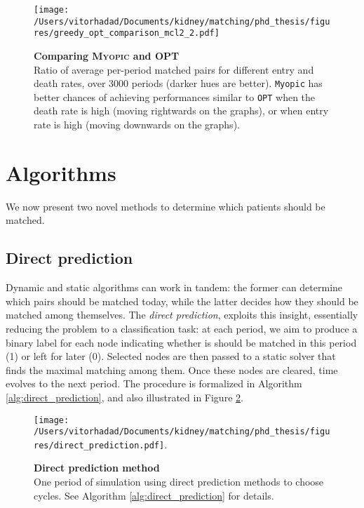 \documentclass[format=acmsmall, review=false]{acmart}
\begin{document}
\begin{figure}[H]
\centering
\hspace*{-3.5cm}
\texttt{[image: /Users/vitorhadad/Documents/kidney/matching/phd\_thesis/figures/greedy\_opt\_comparison\_mcl2\_2.pdf]}
\caption{\textbf{Comparing \textsc{Myopic} and \textsc{OPT}}  \\
Ratio of average per-period matched pairs for different entry and death rates, over 3000 periods (darker hues are better). \texttt{Myopic} has better chances of achieving performances similar to \texttt{OPT} when the death rate is high (moving rightwards on the graphs), or when entry rate is high (moving downwards on the graphs).}
\label{fig:greedy_opt_comparison}
\end{figure}




\section{Algorithms}

We now present two novel methods to determine which patients should be matched.

\subsection{Direct prediction} \label{subsec:direct_prediction}

Dynamic and static algorithms can work in tandem: the former can determine which pairs should be matched today, while the latter decides how they should be matched among themselves. The \emph{direct prediction}, exploits this insight, essentially reducing the problem to a classification task: at each period, we aim to produce a binary label for each node indicating whether is should be matched in this period (1) or left for later (0). Selected nodes are then passed to a static solver that finds the maximal matching among them. Once these nodes are cleared, time evolves to the next period. The procedure is formalized in Algorithm \ref{alg:direct_prediction}, and also illustrated in Figure \ref{fig:direct_prediction}.

\begin{figure}[H]
\centering
\texttt{[image: /Users/vitorhadad/Documents/kidney/matching/phd\_thesis/figures/direct\_prediction.pdf]}.
\caption{\textbf{Direct prediction method} \\ One period of simulation using direct prediction methods to choose cycles. See Algorithm \ref{alg:direct_prediction} for details.}
\label{fig:direct_prediction}
\end{figure}
\end{document}
